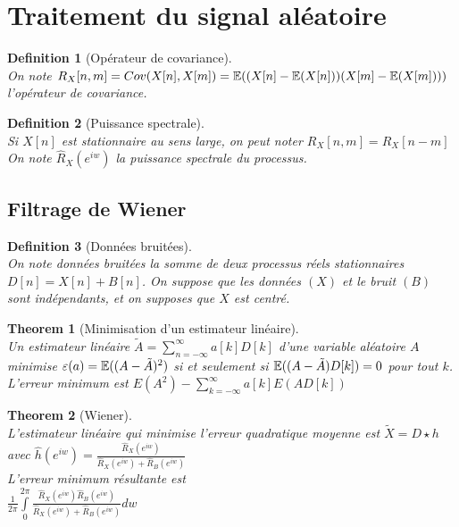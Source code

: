 \documentclass[a4paper]{article}
\newtheorem*{definition}{Definition}
\newtheorem*{theorem}{Theorem}
\newcommand{\E}{\ensuremath\mathbb{E}}
\renewcommand{\(}{\left(}
\renewcommand{\)}{\right)}
\begin{document}
\section{Traitement du signal aléatoire}

\begin{definition}[Opérateur de covariance]~\\
  On note $R_X[n,m] = Cov(X[n],X[m]) = \E((X[n]-\E(X[n]))(X[m]-\E(X[m])))$
  l'opérateur de covariance.
\end{definition}

\begin{definition}[Puissance spectrale]~\\
  Si $X[n]$ est stationnaire au sens large, on peut noter $R_X[n,m] =
  R_X[n-m]$\\
  On note $\hat{R}_X(e^{iw})$ la puissance spectrale du processus.
\end{definition}

\subsection{Filtrage de Wiener}

\begin{definition}[Données bruitées]~\\
  On note données bruitées la somme de deux processus réels stationnaires
  $D[n] = X[n] + B[n]$. On suppose que les données $(X)$ et le bruit $(B)$ sont
  indépendants, et on supposes que $X$ est centré.
\end{definition}


\begin{theorem}[Minimisation d'un estimateur linéaire]~\\
  Un estimateur linéaire $\tilde{A} = \sum\limits_{n=-\infty}^{\infty}a[k]D[k]$
  d'une variable aléatoire $A$ minimise
  $\varepsilon(a) = \E((A-\tilde{A})^2)$ si et seulement si
  $\E((A-\tilde{A})D[k]) = 0$ pour tout $k$.\\
  L'erreur minimum est $E(A^2) - \sum\limits_{k=-\infty}^{\infty}a[k]E(AD[k])$
\end{theorem}

\begin{theorem}[Wiener]~\\
  L'estimateur linéaire qui minimise l'erreur quadratique moyenne est
  $\tilde{X} = D \star h$ avec
  $\hat{h}(e^{iw}) = \frac{\hat{R}_X(e^{iw})}{\hat{R}_X(e^{iw}) + \hat{R}_B(e^{iw}) }$\\
  L'erreur minimum résultante est\\
  $\frac{1}{2\pi} \int\limits_0^{2\pi}
  \frac{\hat{R}_X(e^{iw})\hat{R}_B(e^{iw})}{\hat{R}_X(e^{iw}) + \hat{R}_B(e^{iw})}dw$
\end{theorem}
\end{document}
